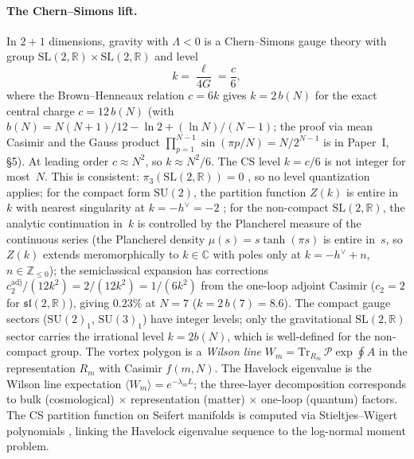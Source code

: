\paragraph{The Chern--Simons lift.}
In $2{+}1$ dimensions, gravity with $\Lambda < 0$ is a
Chern--Simons gauge theory with group
$\mathrm{SL}(2,\mathbb{R}) \times \mathrm{SL}(2,\mathbb{R})$
and level
\begin{equation}\label{eq:cs-level}
  k = \frac{\ell}{4G} = \frac{c}{6},
\end{equation}
where the Brown--Henneaux relation $c = 6k$ gives
$k = 2\,b(N)$ for the exact central charge $c = 12\,b(N)$
(with $b(N) = N(N{+}1)/12 - \ln 2 + (\ln N)/(N{-}1)$;
the proof via mean Casimir and the Gauss product
$\prod_{p=1}^{N-1}\sin(\pi p/N) = N/2^{N-1}$
is in Paper~I, \S5).
At leading order $c \approx N^2$, so $k \approx N^2/6$.
The CS level $k = c/6$ is not integer for most~$N$.
This is consistent:
$\pi_3(\mathrm{SL}(2,\mathbb{R})) = 0$
\citep[\S3]{Witten1988}, so no level quantization applies;
for the compact form $\mathrm{SU}(2)$, the partition
function $Z(k)$ is entire in~$k$ with nearest singularity
at $k = -h^\vee = -2$ \citep{Witten1991};
for the non-compact $\mathrm{SL}(2,\mathbb{R})$,
the analytic continuation in~$k$ is controlled by
the Plancherel measure of the continuous series
\citep{Witten1991}
(the Plancherel density
$\mu(s) = s\tanh(\pi s)$ is entire in~$s$,
so $Z(k)$ extends meromorphically to $k \in \mathbb{C}$
with poles only at $k = -h^\vee + n$, $n \in \mathbb{Z}_{\le 0}$);
the semiclassical expansion has corrections
$c_2^{\mathrm{adj}}/(12k^2) = 2/(12k^2) = 1/(6k^2)$
from the one-loop adjoint Casimir ($c_2 = 2$ for
$\mathfrak{sl}(2,\mathbb{R})$),
giving $0.23\%$ at $N = 7$ ($k = 2\,b(7) = 8.6$).
The compact gauge sectors ($\mathrm{SU}(2)_1$,
$\mathrm{SU}(3)_1$) have integer levels;
only the gravitational $\mathrm{SL}(2,\mathbb{R})$ sector
carries the irrational level $k = 2b(N)$, which is
well-defined for the non-compact group.
The vortex polygon is a \emph{Wilson line}
$W_m = \mathrm{Tr}_{R_m}\,\mathcal{P}\exp\!\oint\! A$
in the representation $R_m$ with Casimir $f(m,N)$.
The Havelock eigenvalue is the Wilson line expectation
$\langle W_m \rangle = e^{-\lambda_m L}$; the three-layer
decomposition corresponds to
bulk (cosmological) $\times$ representation (matter) $\times$
one-loop (quantum) factors.
The CS partition function on Seifert manifolds is computed
via Stieltjes--Wigert polynomials \citep{Tierz2006},
linking the Havelock eigenvalue sequence to the
log-normal moment problem.


